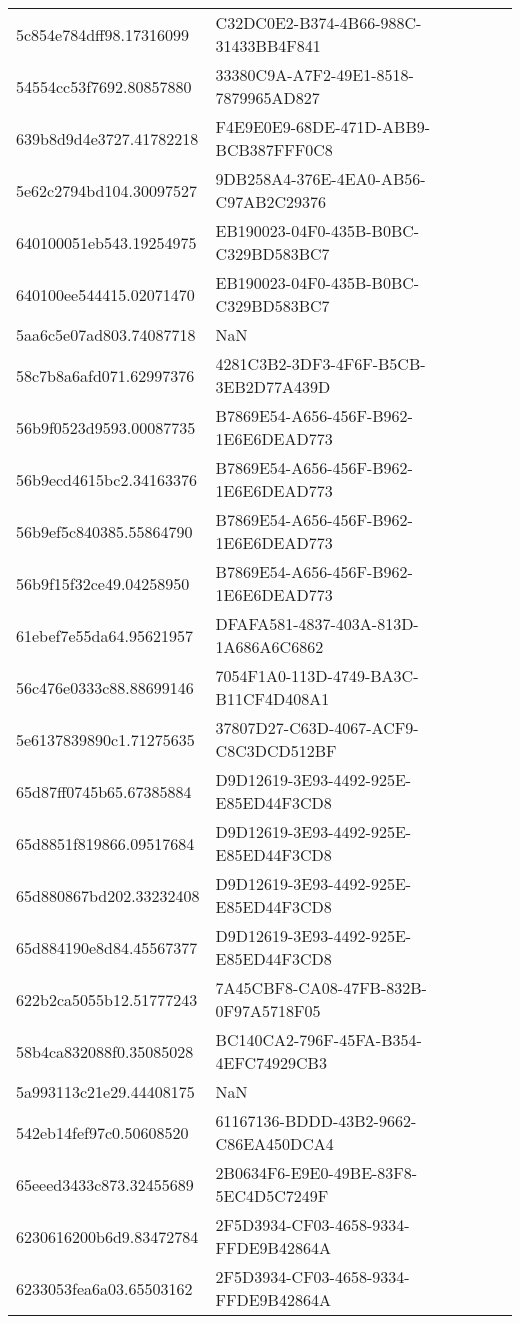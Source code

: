 \begin{tabular}{ll}
5c854e784dff98.17316099 & C32DC0E2-B374-4B66-988C-31433BB4F841 \\
54554cc53f7692.80857880 & 33380C9A-A7F2-49E1-8518-7879965AD827 \\
639b8d9d4e3727.41782218 & F4E9E0E9-68DE-471D-ABB9-BCB387FFF0C8 \\
5e62c2794bd104.30097527 & 9DB258A4-376E-4EA0-AB56-C97AB2C29376 \\
640100051eb543.19254975 & EB190023-04F0-435B-B0BC-C329BD583BC7 \\
640100ee544415.02071470 & EB190023-04F0-435B-B0BC-C329BD583BC7 \\
5aa6c5e07ad803.74087718 & NaN \\
58c7b8a6afd071.62997376 & 4281C3B2-3DF3-4F6F-B5CB-3EB2D77A439D \\
56b9f0523d9593.00087735 & B7869E54-A656-456F-B962-1E6E6DEAD773 \\
56b9ecd4615bc2.34163376 & B7869E54-A656-456F-B962-1E6E6DEAD773 \\
56b9ef5c840385.55864790 & B7869E54-A656-456F-B962-1E6E6DEAD773 \\
56b9f15f32ce49.04258950 & B7869E54-A656-456F-B962-1E6E6DEAD773 \\
61ebef7e55da64.95621957 & DFAFA581-4837-403A-813D-1A686A6C6862 \\
56c476e0333c88.88699146 & 7054F1A0-113D-4749-BA3C-B11CF4D408A1 \\
5e6137839890c1.71275635 & 37807D27-C63D-4067-ACF9-C8C3DCD512BF \\
65d87ff0745b65.67385884 & D9D12619-3E93-4492-925E-E85ED44F3CD8 \\
65d8851f819866.09517684 & D9D12619-3E93-4492-925E-E85ED44F3CD8 \\
65d880867bd202.33232408 & D9D12619-3E93-4492-925E-E85ED44F3CD8 \\
65d884190e8d84.45567377 & D9D12619-3E93-4492-925E-E85ED44F3CD8 \\
622b2ca5055b12.51777243 & 7A45CBF8-CA08-47FB-832B-0F97A5718F05 \\
58b4ca832088f0.35085028 & BC140CA2-796F-45FA-B354-4EFC74929CB3 \\
5a993113c21e29.44408175 & NaN \\
542eb14fef97c0.50608520 & 61167136-BDDD-43B2-9662-C86EA450DCA4 \\
65eeed3433c873.32455689 & 2B0634F6-E9E0-49BE-83F8-5EC4D5C7249F \\
6230616200b6d9.83472784 & 2F5D3934-CF03-4658-9334-FFDE9B42864A \\
6233053fea6a03.65503162 & 2F5D3934-CF03-4658-9334-FFDE9B42864A \\

\end{tabular}
